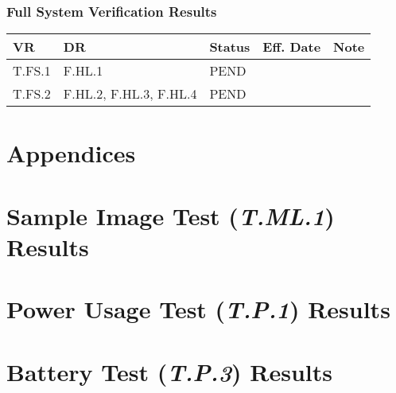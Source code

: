 \documentclass[10pt,letterpaper]{article}
\begin{document}
\subsubsection{Full System Verification Results}
\begin{table}[H]
	\centering
	\begin{tabular}{lllll}
	\hline
	\textbf{VR} & \textbf{DR} & \textbf{Status} & \textbf{Eff. Date} & \textbf{Note}\\
	\hline
    T.FS.1 & F.HL.1  & PEND   & \\
	T.FS.2 & F.HL.2, F.HL.3, F.HL.4 & PEND   & \\
	\hline
	\end{tabular}
\end{table}



\clearpage
{}



 \clearpage
 \appendix
 \section*{Appendices}
 \section{Sample Image Test (\textit{T.ML.1}) Results}\label{appendix:T.ML.1}
 \section{Power Usage Test (\textit{T.P.1}) Results}\label{appendix:T.P.1}
 
 \section{Battery Test (\textit{T.P.3}) Results}\label{appendix:T.P.3}
 

\end{document}
